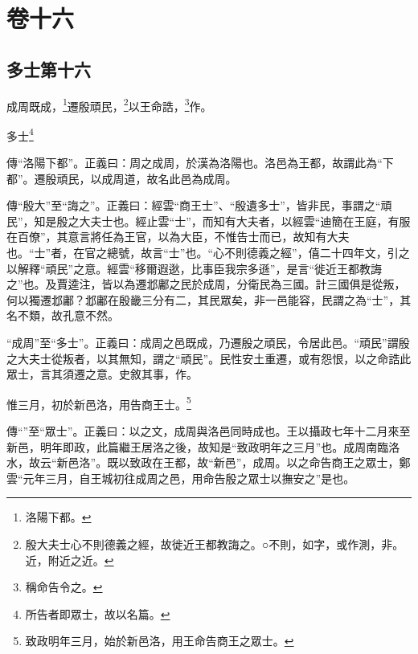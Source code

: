

\chapter{卷十六}


\section{多士第十六}


成周既成，\footnote{洛陽下都。}遷殷頑民，\footnote{殷大夫士心不則德義之經，故徙近王都教誨之。○不則，如字，或作測，非。近，附近之近。}以王命誥，\footnote{稱命告令之。}作。

多士\footnote{所告者即眾士，故以名篇。}


{\noindent\zhuan{}\fzbyks 傳“洛陽下都”。正義曰：周之成周，於漢為洛陽也。洛邑為王都，故謂此為“下都”。遷殷頑民，以成周道，故名此邑為成周。 \par}

{\noindent\zhuan{}\fzbyks 傳“殷大”至“誨之”。正義曰：經雲“商王士”、“殷遺多士”，皆非民，事謂之“頑民”，知是殷之大夫士也。經止雲“士”，而知有大夫者，以經雲“迪簡在王庭，有服在百僚”，其意言將任為王官，以為大臣，不惟告士而已，故知有大夫也。“士”者，在官之總號，故言“士”也。“心不則德義之經”，僖二十四年文，引之以解釋“頑民”之意。經雲“移爾遐逖，比事臣我宗多遜”，是言“徙近王都教誨之”也。及賈逵注，皆以為遷邶鄘之民於成周，分衛民為三國。計三國俱是從叛，何以獨遷邶鄘？邶鄘在殷畿三分有二，其民眾矣，非一邑能容，民謂之為“士”，其名不類，故孔意不然。 \par}

{\noindent\shu{}\fzkt “成周”至“多士”。正義曰：成周之邑既成，乃遷殷之頑民，令居此邑。“頑民”謂殷之大夫士從叛者，以其無知，謂之“頑民”。民性安土重遷，或有怨恨，以之命誥此眾士，言其須遷之意。史敘其事，作。 \par}

惟三月，初於新邑洛，用告商王士。\footnote{致政明年三月，始於新邑洛，用王命告商王之眾士。}


{\noindent\zhuan{}\fzbyks 傳“”至“眾士”。正義曰：以之文，成周與洛邑同時成也。王以攝政七年十二月來至新邑，明年即政，此篇繼王居洛之後，故知是“致政明年之三月”也。成周南臨洛水，故云“新邑洛”。既以致政在王都，故“新邑”，成周。以之命告商王之眾士，鄭雲“元年三月，自王城初往成周之邑，用命告殷之眾士以撫安之”是也。 \par}

